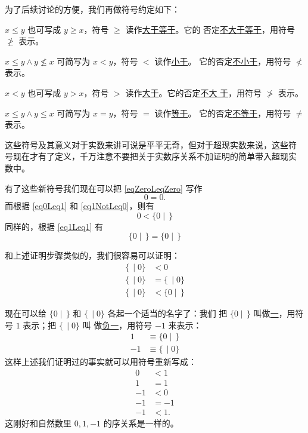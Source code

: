 \documentclass[cs4size,a4paper,adobefonts]{ctexart}
\newcommand{\pname}[1]{\underline{#1}}
\numberwithin{equation}{section}
\begin{document}
为了后续讨论的方便，我们再做符号约定如下：
\begin{symbolDef}
  $x\leq y$ 也可写成 $y\geq x$，符号 $\geq$ 读作\pname{大于等于}。它的
  否定\pname{不大于等于}，用符号 $\ngeq$ 表示。

  $x\leq y\wedge y\nleq x$ 可简写为 $x<y$，符号 $<$ 读作\pname{小于}。
  它的否定\pname{不小于}，用符号 $\nless$ 表示。

  $x<y$ 也可写成 $y>x$，符号 $>$ 读作\pname{大于}。它的否定\pname{不大
    于}，用符号 $\ngtr$ 表示。

  $x\leq y \wedge y \leq x$ 可简写为 $x=y$，符号 $=$ 读作\pname{等于}。
  它的否定\pname{不等于}，用符号 $\neq$ 表示。
\end{symbolDef}

这些符号及其意义对于实数来讲可说是平平无奇，但对于超现实数来说，这些符
号现在才有了定义，千万注意不要把关于实数序关系不加证明的简单带入超现实
数中。

有了这些新符号我们现在可以把 \eqref{eqZeroLeqZero} 写作
\begin{equation}
  0=0.
\end{equation}
而根据 \eqref{eq0Leq1} 和 \eqref{eq1NotLeq0}，则有
\begin{equation}
  0 < \{0\mid\,\}
\end{equation}
同样的，根据 \eqref{eq1Leq1} 有
\begin{equation}
  \{0\mid\,\}=\{0\mid\,\}
\end{equation}

和上述证明步骤类似的，我们很容易可以证明：
\begin{align}
  \{\,\mid 0\} &< 0\\
  \{\,\mid 0\} &= \{\,\mid 0\}\\
  \{\,\mid 0\} &< \{0\mid \,\}
\end{align}

现在可以给 $\{0\mid \,\}$ 和 $\{\,\mid 0\}$ 各起一个适当的名字了：我们
把 $\{0\mid \,\}$ 叫做\pname{一}，用符号 $1$ 表示；把 $\{\,\mid 0\}$ 叫
做\pname{负一}，用符号 $-1$ 来表示：
\begin{align}
  1 &\equiv \{0\mid \,\}\\
  -1 &\equiv \{\,\mid 0\}
\end{align}
这样上述我们证明过的事实就可以用符号重新写成：
\begin{align}
  0 & < 1\\
  1 & = 1\\
  -1 & < 0\\
  -1 & = -1\\
  -1 & < 1.
\end{align}
这刚好和自然数里 $0,1,-1$ 的序关系是一样的。
\end{document}
